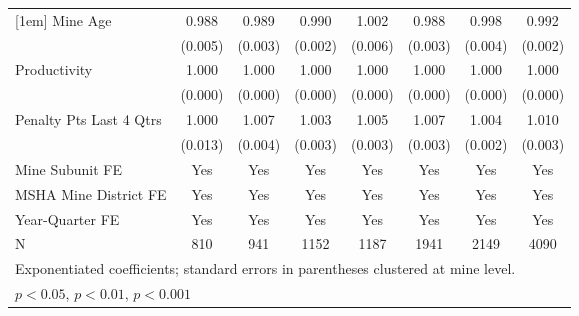 {\begin{tabular}{l*{7}{c}}
[1em]
Mine Age                 &       0.988\sym{*}  &       0.989\sym{**} &       0.990\sym{***}&       1.002         &       0.988\sym{***}&       0.998         &       0.992\sym{***}\\
                         &     (0.005)         &     (0.003)         &     (0.002)         &     (0.006)         &     (0.003)         &     (0.004)         &     (0.002)         \\
[1em]
Productivity             &       1.000         &       1.000         &       1.000\sym{**} &       1.000         &       1.000         &       1.000\sym{*}  &       1.000         \\
                         &     (0.000)         &     (0.000)         &     (0.000)         &     (0.000)         &     (0.000)         &     (0.000)         &     (0.000)         \\
[1em]
Penalty Pts Last 4 Qtrs  &       1.000         &       1.007         &       1.003         &       1.005         &       1.007\sym{*}  &       1.004\sym{*}  &       1.010\sym{***}\\
                         &     (0.013)         &     (0.004)         &     (0.003)         &     (0.003)         &     (0.003)         &     (0.002)         &     (0.003)         \\
[1em]
Mine Subunit FE          &         Yes         &         Yes         &         Yes         &         Yes         &         Yes         &         Yes         &         Yes         \\
[1em]
MSHA Mine District FE    &         Yes         &         Yes         &         Yes         &         Yes         &         Yes         &         Yes         &         Yes         \\
[1em]
Year-Quarter FE          &         Yes         &         Yes         &         Yes         &         Yes         &         Yes         &         Yes         &         Yes         \\
\hline
N                        &         810         &         941         &        1152         &        1187         &        1941         &        2149         &        4090         \\
\hline\hline
\multicolumn{8}{l}{\footnotesize Exponentiated coefficients; standard errors in parentheses clustered at mine level.}\\
\multicolumn{8}{l}{\footnotesize \sym{*} \(p<0.05\), \sym{**} \(p<0.01\), \sym{***} \(p<0.001\)}\\
\end{tabular}
}

